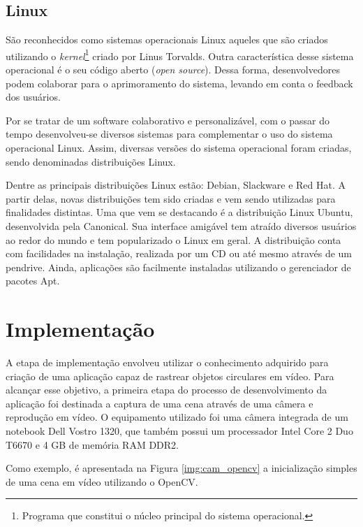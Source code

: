 \subsection{Linux}

São reconhecidos como sistemas operacionais Linux aqueles que são criados utilizando o \textit{kernel}\footnote{Programa que constitui o núcleo principal do sistema operacional.} criado por Linus Torvalds. Outra característica desse sistema operacional é o seu código aberto (\textit{open source}). Dessa forma, desenvolvedores podem colaborar para o aprimoramento do sistema, levando em conta o feedback dos usuários.

Por se tratar de um software colaborativo e personalizável, com o passar do tempo desenvolveu-se diversos sistemas para complementar o uso do sistema operacional Linux. Assim, diversas versões do sistema operacional foram criadas, sendo denominadas distribuições Linux.

Dentre as principais distribuições Linux estão: Debian, Slackware e Red Hat. A partir delas, novas distribuições tem sido criadas e vem sendo utilizadas para finalidades distintas. Uma que vem se destacando é a distribuição Linux Ubuntu, desenvolvida pela Canonical. Sua interface amigável tem atraído diversos usuários ao redor do mundo e tem popularizado o Linux em geral. A distribuição conta com facilidades na instalação, realizada por um CD ou até mesmo através de um pendrive. Ainda, aplicações são facilmente instaladas utilizando o gerenciador de pacotes Apt.

\section{Implementação}

A etapa de implementação envolveu utilizar o conhecimento adquirido para criação de uma aplicação capaz de rastrear objetos circulares em vídeo. Para alcançar esse objetivo, a primeira etapa do processo de desenvolvimento da aplicação foi destinada a captura de uma cena através de uma câmera e reprodução em vídeo. O equipamento utilizado foi uma câmera integrada de um notebook Dell Vostro 1320, que também possui um processador Intel Core 2 Duo T6670 e 4 GB de memória RAM DDR2.

Como exemplo, é apresentada na Figura \ref{img:cam_opencv} a inicialização simples de uma cena em vídeo utilizando o OpenCV.


